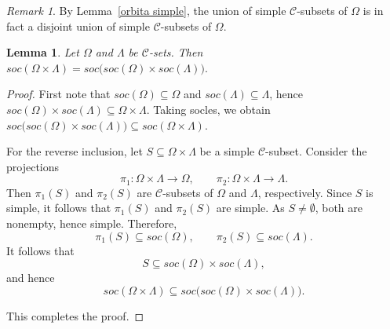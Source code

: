 \documentclass[a4paper]{article}
\newtheorem{lem}[thm]{Lemma}
\theoremstyle{definition}
\theoremstyle{remark}
\newtheorem{rem}[thm]{Remark}
\newcommand*{\cat}[1]{\mathcal{#1}}
\begin{document}
\begin{rem}
By Lemma~\ref{orbita simple}, the union of simple $\cat{C}$-subsets of $\Omega$ is in fact a disjoint union of simple $\cat{C}$-subsets of $\Omega$.
\end{rem}


\begin{lem} \label{soc}
Let $\Omega$ and $\Lambda$ be $\cat{C}$-sets. Then $ soc( \Omega \times \Lambda) = soc\bigl(soc(\Omega) \times soc(\Lambda)\bigr). $
\end{lem}

\begin{proof}
First note that $soc(\Omega) \subseteq \Omega$ and $soc(\Lambda) \subseteq \Lambda$, hence
$ 
    soc(\Omega) \times soc(\Lambda) \subseteq \Omega \times \Lambda.
$
Taking socles, we obtain
$ 
    soc\bigl(soc(\Omega) \times soc(\Lambda)\bigr) \subseteq soc(\Omega \times \Lambda).
$

For the reverse inclusion, let $S \subseteq \Omega \times \Lambda$ be a simple $\cat{C}$-subset. Consider the projections
\[
    \pi_1 \colon \Omega \times \Lambda \to \Omega, \qquad
    \pi_2 \colon \Omega \times \Lambda \to \Lambda.
\]
Then $\pi_1(S)$ and $\pi_2(S)$ are $\cat{C}$-subsets of $\Omega$ and $\Lambda$, respectively. Since $S$ is simple, it follows that $\pi_1(S)$ and $\pi_2(S)$ are simple. As $S \neq \emptyset$, both are nonempty, hence simple. Therefore,
\[
    \pi_1(S) \subseteq soc(\Omega), \qquad \pi_2(S) \subseteq soc(\Lambda).
\]
It follows that
\[
    S \subseteq soc(\Omega) \times soc(\Lambda),
\]
and hence
\[
    soc(\Omega \times \Lambda) \subseteq soc\bigl(soc(\Omega) \times soc(\Lambda)\bigr).
\]

This completes the proof.
\end{proof}
\end{document}
